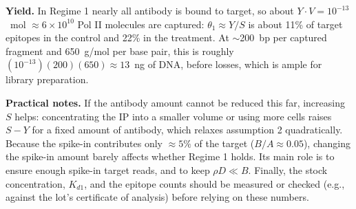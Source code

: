 \documentclass[11pt]{article}
\begin{document}
\textbf{Yield.} In Regime 1 nearly all antibody is bound to target, so
about $Y\cdot V=10^{-13}$~mol $\approx6\times10^{10}$ Pol II molecules are
captured: $\theta_1\approx Y/S$ is about 11\% of target epitopes in the
control and 22\% in the treatment. At $\sim$200~bp per captured fragment
and 650~g/mol per base pair, this is roughly
$(10^{-13})(200)(650)\approx13$~ng of DNA, before losses, which is ample
for library preparation.

\textbf{Practical notes.} If the antibody amount cannot be reduced this
far, increasing $S$ helps: concentrating the IP into a smaller volume or
using more cells raises $S-Y$ for a fixed amount of antibody, which
relaxes assumption 2 quadratically. Because the spike-in contributes
only $\approx5\%$ of the target ($B/A\approx0.05$), changing the spike-in
amount barely affects whether Regime 1 holds. Its main role is to
ensure enough spike-in target reads, and to keep $\rho D\ll B$. Finally,
the stock concentration, $K_{d1}$, and the epitope counts should be
measured or checked (e.g., against the lot's certificate of analysis) before
relying on these numbers.












\end{document}
